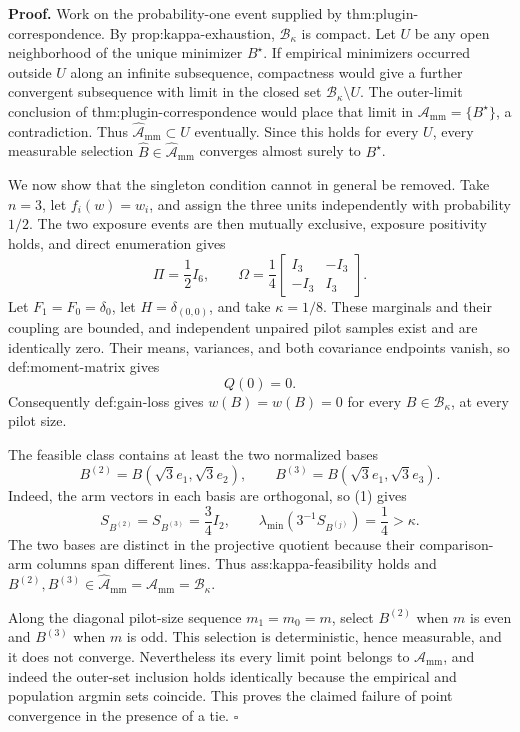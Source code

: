 \textbf{Proof.}
Work on the probability-one event supplied by thm:plugin-correspondence.  By prop:kappa-exhaustion, \(\mathcal B_\kappa\) is compact.  Let \(U\) be any open neighborhood of the unique minimizer \(B^\star\).  If empirical minimizers occurred outside \(U\) along an infinite subsequence, compactness would give a further convergent subsequence with limit in the closed set \(\mathcal B_\kappa\setminus U\).  The outer-limit conclusion of thm:plugin-correspondence would place that limit in \(\mathcal A_{\mathrm{mm}}=\{B^\star\}\), a contradiction.  Thus \(\widehat{\mathcal A}_{\mathrm{mm}}\subset U\) eventually.  Since this holds for every \(U\), every measurable selection \(\widehat B\in\widehat{\mathcal A}_{\mathrm{mm}}\) converges almost surely to \(B^\star\).

We now show that the singleton condition cannot in general be removed.  Take \(n=3\), let \(f_i(w)=w_i\), and assign the three units independently with probability \(1/2\).  The two exposure events are then mutually exclusive, exposure positivity holds, and direct enumeration gives
\[
 \Pi=\frac12I_6,
 \qquad
 \Omega=\frac14
 \begin{bmatrix}
  I_3&-I_3\\
  -I_3&I_3
 \end{bmatrix}.
 \tag{1}
\]
Let \(F_1=F_0=\delta_0\), let \(H=\delta_{(0,0)}\), and take \(\kappa=1/8\).  These marginals and their coupling are bounded, and independent unpaired pilot samples exist and are identically zero.  Their means, variances, and both covariance endpoints vanish, so def:moment-matrix gives
\[
 Q(0)=0.
 \tag{2}
\]
Consequently def:gain-loss gives \(w(B)=\widehat w(B)=0\) for every \(B\in\mathcal B_\kappa\), at every pilot size.

The feasible class contains at least the two normalized bases
\[
 B^{(2)}=B(\sqrt3e_1,\sqrt3e_2),
 \qquad
 B^{(3)}=B(\sqrt3e_1,\sqrt3e_3).
 \tag{3}
\]
Indeed, the arm vectors in each basis are orthogonal, so (1) gives
\[
 S_{B^{(2)}}=S_{B^{(3)}}=\frac34I_2,
 \qquad
 \lambda_{\min}\!\left(3^{-1}S_{B^{(j)}}\right)=\frac14>\kappa.
 \tag{4}
\]
The two bases are distinct in the projective quotient because their comparison-arm columns span different lines.  Thus ass:kappa-feasibility holds and
\(B^{(2)},B^{(3)}\in\widehat{\mathcal A}_{\mathrm{mm}}=\mathcal A_{\mathrm{mm}}=\mathcal B_\kappa\).

Along the diagonal pilot-size sequence \(m_1=m_0=m\), select \(B^{(2)}\) when \(m\) is even and \(B^{(3)}\) when \(m\) is odd.  This selection is deterministic, hence measurable, and it does not converge.  Nevertheless its every limit point belongs to \(\mathcal A_{\mathrm{mm}}\), and indeed the outer-set inclusion holds identically because the empirical and population argmin sets coincide.  This proves the claimed failure of point convergence in the presence of a tie.  \(\square\)